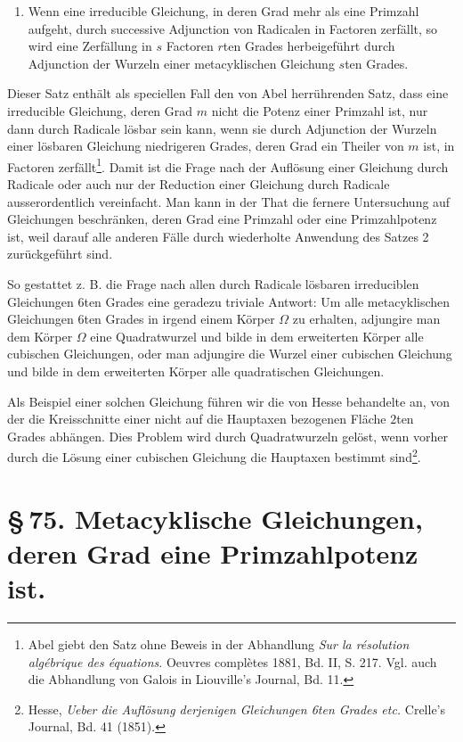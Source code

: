 \documentclass[11pt]{article}
\begin{document}
\begin{enumerate}[label=\arabic*.,leftmargin=2.6em,start=2]
\item Wenn eine irreducible Gleichung, in deren Grad mehr als eine Primzahl aufgeht, durch successive Adjunction von Radicalen in Factoren zerfällt, so wird eine Zerfällung in $s$ Factoren $r$ten Grades herbeigeführt durch Adjunction der Wurzeln einer metacyklischen Gleichung $s$ten Grades.
\end{enumerate}

Dieser Satz enthält als speciellen Fall den von Abel herrührenden Satz, dass eine irreducible Gleichung, deren Grad $m$ nicht die Potenz einer Primzahl ist, nur dann durch Radicale lösbar sein kann, wenn sie durch Adjunction der Wurzeln einer lösbaren Gleichung niedrigeren Grades, deren Grad ein Theiler von $m$ ist, in Factoren zerfällt\footnote{Abel giebt den Satz ohne Beweis in der Abhandlung \emph{Sur la résolution algébrique des équations}. Oeuvres complètes 1881, Bd. II, S. 217. Vgl. auch die Abhandlung von Galois in Liouville's Journal, Bd. 11.}. Damit ist die Frage nach der Auflösung einer Gleichung durch Radicale oder auch nur der Reduction einer Gleichung durch Radicale ausserordentlich vereinfacht. Man kann in der That die fernere Untersuchung auf Gleichungen beschränken, deren Grad eine Primzahl oder eine Primzahlpotenz ist, weil darauf alle anderen Fälle durch wiederholte Anwendung des Satzes 2 zurückgeführt sind.

So gestattet z. B. die Frage nach allen durch Radicale lösbaren irreduciblen Gleichungen $6$ten Grades eine geradezu triviale Antwort: Um alle metacyklischen Gleichungen $6$ten Grades in irgend einem Körper $\Omega$ zu erhalten, adjungire man dem Körper $\Omega$ eine Quadratwurzel und bilde in dem erweiterten Körper alle cubischen Gleichungen, oder man adjungire die Wurzel einer cubischen Gleichung und bilde in dem erweiterten Körper alle quadratischen Gleichungen.

Als Beispiel einer solchen Gleichung führen wir die von Hesse behandelte an, von der die Kreisschnitte einer nicht auf die Hauptaxen bezogenen Fläche $2$ten Grades abhängen. Dies Problem wird durch Quadratwurzeln gelöst, wenn vorher durch die Lösung einer cubischen Gleichung die Hauptaxen bestimmt sind\footnote{Hesse, \emph{Ueber die Auflösung derjenigen Gleichungen 6ten Grades etc.} Crelle's Journal, Bd. 41 (1851).}.

\section*{\S\,75. Metacyklische Gleichungen, deren Grad eine Primzahlpotenz ist.}
\end{document}
